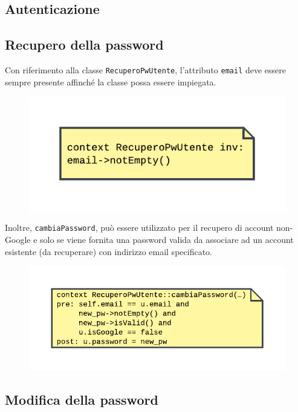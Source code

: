 \documentclass[11pt, a4paper]{article}
\theoremstyle{definition} %
\begin{document}
\subsection{Autenticazione}

\subsection{Recupero della password}
Con riferimento alla classe \texttt{RecuperoPwUtente},
l'attributo \texttt{email} deve essere sempre presente affinché la classe
possa essere impiegata.
\begin{figure}[H]
\centering
\includegraphics[scale = 1]{materiale/ocl-recuperoemail.pdf}
\end{figure}
\noindent Inoltre, \texttt{cambiaPassword}, può essere utilizzato per il
recupero di account non-Google e solo se viene fornita una password
valida da associare ad un account esistente (da recuperare) con indirizzo
email specificato.
\begin{figure}[H]
\centering
\includegraphics[scale = 0.9]{materiale/ocl-recuperopassword.pdf}
\end{figure}

\subsection{Modifica della password}
\end{document}
